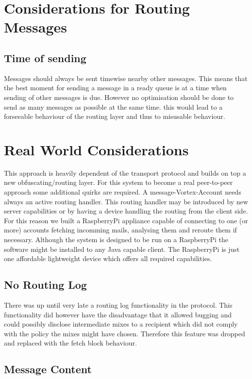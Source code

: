 
\section{Considerations for Routing Messages}
\subsection{Time of sending}
Messages should always be sent timewise nearby other messages. This means that the best moment for sending a message in a ready queue is at a time when sending of other messages is due. However no optimisation should be done to send as many messages as possible at the same time. this would lead to a forseeable behaviour of the routing layer and thus to misusable behaviour.

\section{Real World Considerations}
This approach is heavily dependent of the transport protocol and builds on top a new obfuscating/routing layer. For this system to become a real peer-to-peer approach some additional quirks are required. A message-Vortex-Account needs always an active routing handler. This routing handler may be introduced by new server capabilities or by having a device handling the routing from the client side. For this reason we built a RaspberryPi appliance capable of connecting to one (or more) accounts fetching incomming mails, analysing them and reroute them if necessary. Although the system is designed to be run on a RaspberryPi the software might be installed to any Java capable client. The RaspberryPi is just one affordable lightweight device which offers all required capabilities.

\subsection{No Routing Log}
There was up until very late a routing log functionality in the protocol. This functionality did however have the disadvantage that it allowed bugging and could possibly  disclose intermediate mixes to a recipient which did not comply with the policy the mixes might have chosen. Therefore this feature was dropped and replaced with the fetch block behaviour.

\subsection{Message Content}

